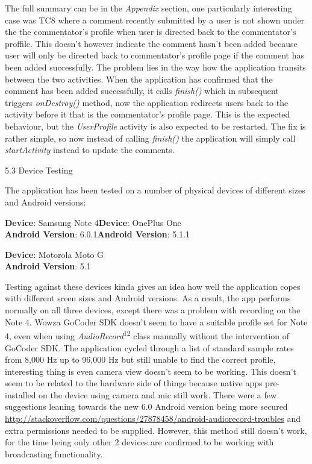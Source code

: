 \documentclass{article}
\begin{document}
\begin{flushleft}
The full summary can be in the \textit{Appendix} section, one particularly interesting case was TC8 where a comment recently submitted by a user is not shown under the the commentator's profile when user is directed back to the commentator's proffile. This doesn't however indicate the comment hasn't been added because user will only be directed back to commentator's profile page if the comment has been added successfully. The problem lies in the way how the application transits between the two activities. When the application has confirmed that the comment has been added successfully, it calls \textit{finish()} which in subsequent triggers \textit{onDestroy()} method, now the application redirects users back to the activity before it that is the commentator's profile page. This is the expected behaviour, but the \textit{UserProfile} activity is also expected to be restarted. The fix is rather simple, so now instead of calling \textit{finish()} the application will simply call \textit{startActivity} instead to update the comments.\par
{\Large 5.3 Device Testing}\par
The application has been tested on a number of physical devices of different sizes and Android versions:\par
\noindent \textbf{Device}: Samsung Note 4\hfill \textbf{Device}: OnePlus One\\
\noindent \textbf{Android Version}: 6.0.1\hfill \textbf{Android Version}: 5.1.1\par
\textbf{Device}: Motorola Moto G\\
\textbf{Android Version}: 5.1\par
Testing against these devices kinda gives an idea how well the application copes with different sreen sizes and Android versions. As a result, the app performs normally on all three devices, except there was a problem with recording on the Note 4. Wowza GoCoder SDK doesn't seem to have a suitable profile set for Note 4, even when using \textit{AudioRecord}\textsuperscript{12} class manually without the intervention of GoCoder SDK. The application cycled through a list of standard sample rates from 8,000 Hz up to 96,000 Hz but still unable to find the correct profile, interesting thing is even camera view doesn't seem to be working. This doesn't seem to be related to the hardware side of things because native apps pre-installed on the device using camera and mic still work. There were a few suggestions leaning towards the new 6.0 Android version being more secured \url{http://stackoverflow.com/questions/27878458/android-audiorecord-troubles} and extra permissions needed to be supplied. However, this method still doesn't work, for the time being only other 2 devices are confirmed to be working with broadcasting functionality.\par

\end{flushleft}
\end{document}
